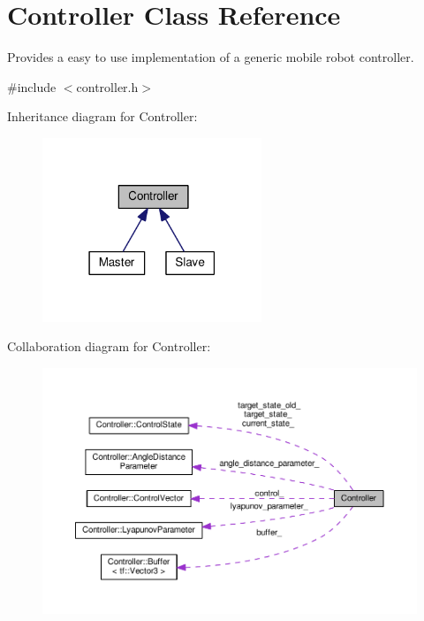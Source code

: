 \hypertarget{classController}{}\section{Controller Class Reference}
\label{classController}


Provides a easy to use implementation of a generic mobile robot controller.  




{\ttfamily \#include $<$controller.\+h$>$}



Inheritance diagram for Controller\+:\nopagebreak
\begin{figure}[H]
\begin{center}
\leavevmode
\includegraphics[width=186pt]{dc/d30/classController__inherit__graph}
\end{center}
\end{figure}


Collaboration diagram for Controller\+:\nopagebreak
\begin{figure}[H]
\begin{center}
\leavevmode
\includegraphics[width=350pt]{dd/d93/classController__coll__graph}
\end{center}
\end{figure}
